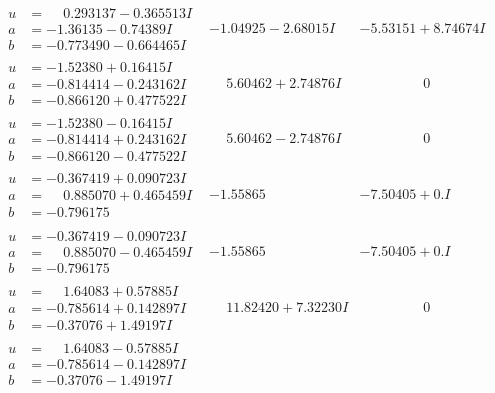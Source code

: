 \documentclass[1p]{elsarticle_modified}
\theoremstyle{definition}
\begin{document}
$$\begin{array}{c|c|c}
\begin{aligned}
u &= \phantom{-}0.293137 - 0.365513 I \\
a &= -1.36135 - 0.74389 I \\
b &= -0.773490 - 0.664465 I\end{aligned}
 & -1.04925 - 2.68015 I & -5.53151 + 8.74674 I \\ \hline\begin{aligned}
u &= -1.52380 + 0.16415 I \\
a &= -0.814414 - 0.243162 I \\
b &= -0.866120 + 0.477522 I\end{aligned}
 & \phantom{-}5.60462 + 2.74876 I & \phantom{-0.000000 } 0 \\ \hline\begin{aligned}
u &= -1.52380 - 0.16415 I \\
a &= -0.814414 + 0.243162 I \\
b &= -0.866120 - 0.477522 I\end{aligned}
 & \phantom{-}5.60462 - 2.74876 I & \phantom{-0.000000 } 0 \\ \hline\begin{aligned}
u &= -0.367419 + 0.090723 I \\
a &= \phantom{-}0.885070 + 0.465459 I \\
b &= -0.796175\phantom{ +0.000000I}\end{aligned}
 & -1.55865\phantom{ +0.000000I} & -7.50405 + 0. I\phantom{ +0.000000I} \\ \hline\begin{aligned}
u &= -0.367419 - 0.090723 I \\
a &= \phantom{-}0.885070 - 0.465459 I \\
b &= -0.796175\phantom{ +0.000000I}\end{aligned}
 & -1.55865\phantom{ +0.000000I} & -7.50405 + 0. I\phantom{ +0.000000I} \\ \hline\begin{aligned}
u &= \phantom{-}1.64083 + 0.57885 I \\
a &= -0.785614 + 0.142897 I \\
b &= -0.37076 + 1.49197 I\end{aligned}
 & \phantom{-}11.82420 + 7.32230 I & \phantom{-0.000000 } 0 \\ \hline\begin{aligned}
u &= \phantom{-}1.64083 - 0.57885 I \\
a &= -0.785614 - 0.142897 I \\
b &= -0.37076 - 1.49197 I\end{aligned}

\end{array}$$
\end{document}
